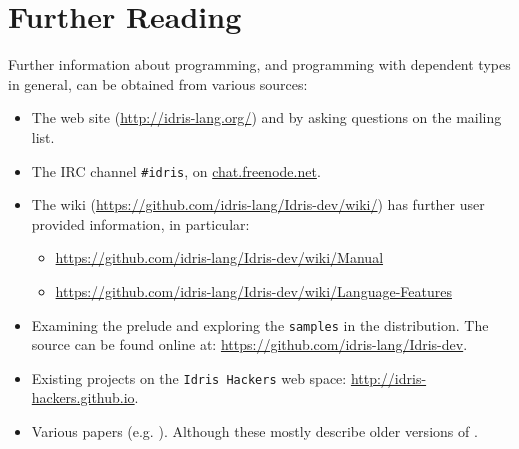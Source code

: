 \section{Further Reading}

Further information about \Idris{} programming, and programming with dependent
types in general, can be obtained from various sources:

\begin{itemize}
\item The \Idris{} web site (\url{http://idris-lang.org/}) and by asking questions on the mailing list.
\item The IRC channel \texttt{\#idris}, on \url{chat.freenode.net}.
\item The wiki (\url{https://github.com/idris-lang/Idris-dev/wiki/}) has
further user provided information, in particular:
\begin{itemize}
\item \url{https://github.com/idris-lang/Idris-dev/wiki/Manual}
\item \url{https://github.com/idris-lang/Idris-dev/wiki/Language-Features}
\end{itemize}
\item Examining the prelude and exploring the \texttt{samples} in the distribution.
The \Idris{} source can be found online at: \url{https://github.com/idris-lang/Idris-dev}.
\item Existing projects on the \texttt{Idris Hackers} web space: \url{http://idris-hackers.github.io}.
\item Various papers (e.g. \cite{plpv11, scrap-engine,res-dsl-padl12}).
Although these mostly describe older versions of \Idris{}.
\end{itemize}

